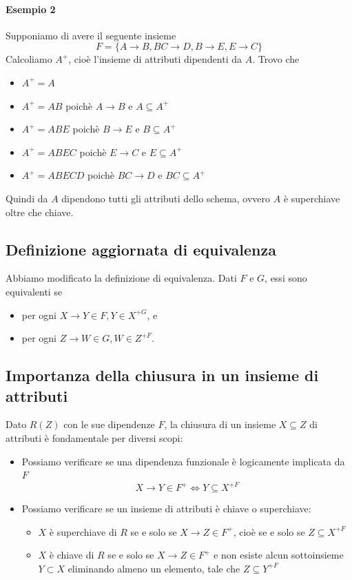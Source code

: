\paragraph{Esempio 2} Supponiamo di avere il seguente insieme
\[F = \{  A \to B, BC \to D, B \to E, E \to C \}\]
Calcoliamo $A^{+}$, cioè l'insieme di attributi dipendenti da $A$. Trovo che
\begin{itemize}
	\item $A^{+} = A$
	\item $A^{+} = AB$ poichè $A \to B$ e $A \subseteq A^{+}$
	\item $A^{+} = ABE$ poichè $B \to E$ e $B \subseteq A^{+}$
	\item $A^{+} = ABEC$ poichè $E \to C$ e $E \subseteq A^{+}$
	\item $A^{+} = ABECD$ poichè $BC \to D$ e $BC \subseteq A^{+}$
\end{itemize}
Quindi da $A$ dipendono tutti gli attributi dello schema, ovvero $A$ è superchiave oltre che chiave.
\subsection{Definizione aggiornata di equivalenza} Abbiamo modificato la definizione di equivalenza. Dati $F$ e $G$, essi sono equivalenti se
\begin{itemize}
	\item per ogni $X \to Y \in F, Y \in X^{+G}$, e
	\item per ogni $Z \to W \in G, W \in Z^{+F}$.
\end{itemize}
\subsection{Importanza della chiusura in un insieme di attributi} Dato $R(Z)$ con le sue dipendenze $F$, la chiusura di un insieme $X \subseteq Z$ di attributi è fondamentale per diversi scopi:
\begin{itemize}
	\item Possiamo verificare se una dipendenza funzionale è logicamente implicata da $F$
	\[X \to Y \in F^+ \Longleftrightarrow Y \subseteq X^{+F}\]
	\item Possiamo verificare se un insieme di attributi è chiave o superchiave:
	\begin{itemize}
		\item $X$ è superchiave di $R$ se e solo se $X \to Z \in F^+$, cioè se e solo se $Z \subseteq X^{+F}$
		\item $X$ è chiave di $R$ se e solo se $X \to Z \in F^+$ e non esiste alcun sottoinsieme $Y \subset X$ eliminando almeno un elemento, tale che $Z \subseteq Y^{+F}$
	\end{itemize}
\end{itemize}
